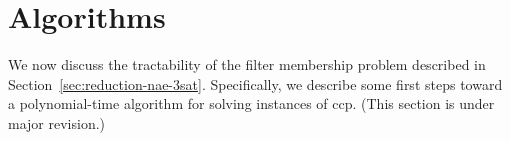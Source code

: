 \documentclass[12pt]{amsart}
\numberwithin{equation}{section}
\theoremstyle{plain}
\theoremstyle{definition}
\newcommand{\ccp}{\acs{ccp}\xspace}
\begin{document}
\section{Algorithms}
We now discuss the tractability of
the filter membership problem described in Section~\ref{sec:reduction-nae-3sat}.
Specifically, we describe some first steps
toward a polynomial-time algorithm for solving instances of \ccp.
\vskip5mm
(This section is under major revision.)




\printbibliography
\end{document}
